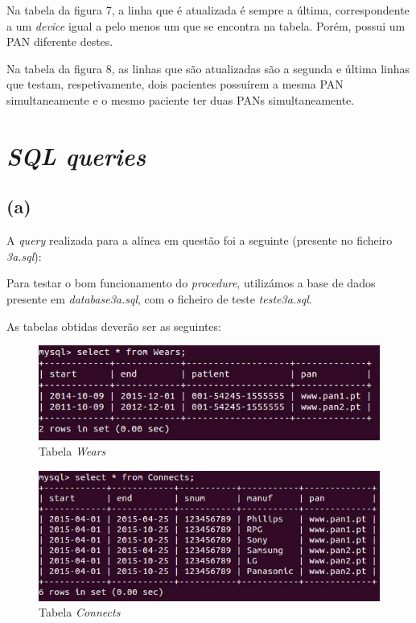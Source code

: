 \documentclass[a4paper]{article}
\begin{document}
Na tabela da figura 7, a linha que é atualizada é sempre a última, correspondente a um \textit{device} igual a pelo menos um que se encontra na tabela. Porém, possui um PAN diferente destes.

Na tabela da figura 8, as linhas que são atualizadas são a segunda e última linhas que testam,  respetivamente, dois pacientes possuírem a mesma PAN simultaneamente e o mesmo paciente ter duas PANs simultaneamente.
\section{\textit{SQL queries}}
\subsection*{(a)}
A \textit{query} realizada para a alínea em questão foi a seguinte (presente no ficheiro \textit{3a.sql}):



Para testar o bom funcionamento do \textit{procedure}, utilizámos a base de dados presente em \textit{database3a.sql}, com o ficheiro de teste \textit{teste3a.sql}.

As tabelas obtidas deverão ser as seguintes:

\begin{figure}[ht!]
\centering
\includegraphics[scale=0.53]{3awears.jpg}
\caption{Tabela \textit{Wears}}
\end{figure}

\begin{figure}[ht!]
\centering
\includegraphics[scale=0.53]{3aconnects.jpg}
\caption{Tabela \textit{Connects}}
\end{figure}
\end{document}
